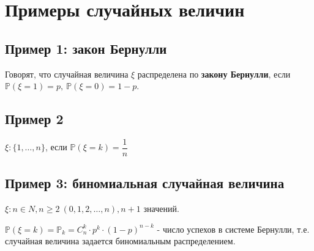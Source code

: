 \documentclass[../Main.tex]{subfiles}
\begin{document}
\section{Примеры случайных величин}

\subsection*{Пример 1: закон Бернулли}
Говорят, что случайная величина \(\xi\) распределена по \textbf{закону Бернулли}, если \(\mathbb{P}(\xi = 1) = p, \ \mathbb{P}(\xi =  0) = 1-p\).

\subsection*{Пример 2}

\(\xi : \{1, \dots, n\}\), если \(\mathbb{P}(\xi = k) = \dfrac{1}{n}\)

\subsection*{Пример 3: биномиальная случайная величина}

\(\xi:n \in N, n \geq 2 \ (0, 1, 2, \dots, n), n+1\) значений.

\(\mathbb{P}(\xi = k) =\mathbb{P}_k = C_n^k \cdot p^k \cdot (1-p)^{n-k}\) - число успехов в системе Бернулли, т.е. случайная величина задается биномиальным распределением.
\end{document}
